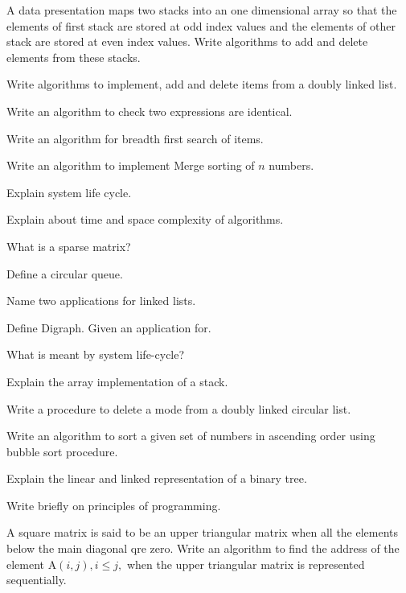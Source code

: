 \newpage \again

\item A data presentation maps two stacks into an one dimensional array so that the elements
  of first stack are stored at odd index values and the elements of other stack are stored at
  even index values. Write algorithms to add and delete elements from these stacks.
\ene

\item \iitem Write algorithms to implement, add and delete items from a doubly linked list.
\Or
\item Write an algorithm to check two expressions are identical.
\ene

\item \iitem Write an algorithm for breadth first search of items.
\Or
\item Write an algorithm to implement Merge sorting of $n$ numbers.
\ene

\item \iitem Explain system life cycle.
\Or
\item Explain about time and space complexity of algorithms.
\ene

\markC
\ene

\newpage

\sub{\subj}
\maxtime

\partA

\iitem What is a sparse matrix?
\item Define a circular queue.
\item Name two applications for linked lists.
\item Define Digraph. Given an application for.
\item What is meant by system life-cycle?

\markA
\partB

\item Explain the array implementation of a stack.
\item Write a procedure to delete a mode from a doubly
  linked circular list.
\item Write an algorithm to sort a given set of numbers in 
  ascending order using bubble sort procedure.
\item Explain the linear and linked representation of a binary tree.
\item Write briefly on principles of programming.
\item A square matrix is said to be an upper triangular matrix when all
  the elements below the main diagonal qre zero. Write an algorithm to find
  the address of the element A$ (i, j), i\leq j,$ when the upper triangular
  matrix is represented sequentially.

